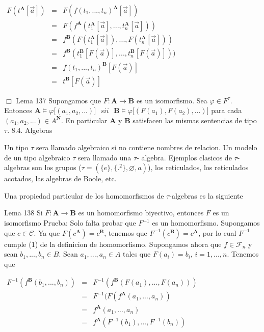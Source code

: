 \(\displaystyle \begin{array}{ccl} F(t^{\mathbf{A}}[\vec{a}]) & = & F(f(t_{1},...,t_{n})^{\mathbf{A}}[\vec{a}]) \\ & = & F(f^{\mathbf{A}}(t_{1}^{\mathbf{A}}[\vec{a}],...,t_{n}^{\mathbf{A}}[ \vec{a}])) \\ & = & f^{\mathbf{B}}(F(t_{1}^{\mathbf{A}}[\vec{a}]),...,F(t_{n}^{\mathbf{A}}[ \vec{a}])) \\ & = & f^{\mathbf{B}}(t_{1}^{\mathbf{B}}[F(\vec{a})],...,t_{n}^{\mathbf{B}}[F( \vec{a})])) \\ & = & f(t_{1},...,t_{n})^{\mathbf{B}}[F(\vec{a})] \\ & = & t^{\mathbf{B}}[F(\vec{a})] \end{array} \)

\(\Box\)
Lema 137 Supongamos que \(F:\mathbf{A}\rightarrow \mathbf{B}\) es un isomorfismo\(.\) Sea \(\varphi \in F^{\tau }.\) Entonces
\(\displaystyle \mathbf{A}\models \varphi \lbrack (a_{1},a_{2},...)]\text{ }sii\text{ } \mathbf{B}\models \varphi \lbrack (F(a_{1}),F(a_{2}),...)] \)
para cada \((a_{1},a_{2},...)\in A^{\mathbf{N}}\). En particular \(\mathbf{A}\) y \(\mathbf{B}\) satisfacen las mismas sentencias de tipo \(\tau \).
8.4. Algebras

Un tipo \(\tau \) sera llamado algebraico si no contiene nombres de relacion. Un modelo de un tipo algebraico \(\tau \) sera llamado una \(\tau \)- algebra. Ejemplos clasicos de \(\tau \)-algebras son los grupos (\( \tau =(\{e\},\{.^{2}\},\varnothing ,a)\)), los reticulados, los reticulados acotados, las algebras de Boole, etc.

Una propiedad particular de los homomorfismos de \(\tau \)-algebras es la siguiente

Lema 138 Si \(F:\mathbf{A}\rightarrow \mathbf{B}\) es un homomorfismo biyectivo, entonces \(F\) es un isomorfismo
Prueba: Solo falta probar que \(F^{-1}\) es un homomorfismo. Supongamos que \(c\in \mathcal{C}\). Ya que \(F(c^{\mathbf{A}})=c^{\mathbf{B}}\), tenemos que \( F^{-1}(c^{\mathbf{B}})=c^{\mathbf{A}}\), por lo cual \(F^{-1}\) cumple (1) de la definicion de homomorfismo. Supongamos ahora que \(f\in \mathcal{F}_{n}\) y sean \(b_{1},...,b_{n}\in B\). Sean \(a_{1},...,a_{n}\in A\) tales que \( F(a_{i})=b_{i}\), \(i=1,...,n\). Tenemos que

\(\displaystyle \begin{array}{ccl} F^{-1}(f^{\mathbf{B}}(b_{1},...,b_{n})) & = & F^{-1}(f^{\mathbf{B} }(F(a_{1}),...,F(a_{n}))) \\ & = & F^{-1}(F(f^{\mathbf{A}}(a_{1},...,a_{n})) \\ & = & f^{\mathbf{A}}(a_{1},...,a_{n}) \\ & = & f^{\mathbf{A}}(F^{-1}(b_{1}),...,F^{-1}(b_{n})) \end{array} \)

